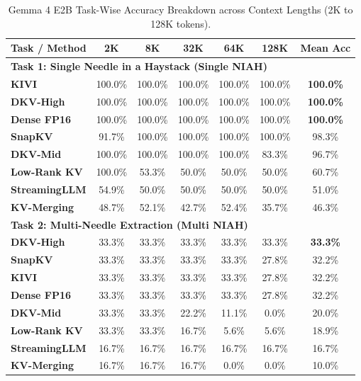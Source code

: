 \documentclass[10pt]{article}
\theoremstyle{definition}
\begin{document}
\begin{table}[h]
\vspace{6pt}
\centering
\small
\caption{Gemma 4 E2B Task-Wise Accuracy Breakdown across Context Lengths (2K to 128K tokens).}
\label{tab:e2b_task_breakdown}
\begin{tabular}{lcccccc}
\toprule
\textbf{Task / Method} & \textbf{2K} & \textbf{8K} & \textbf{32K} & \textbf{64K} & \textbf{128K} & \textbf{Mean Acc} \\
\midrule
\multicolumn{7}{l}{\textbf{Task 1: Single Needle in a Haystack (Single NIAH)}} \\
\textbf{KIVI} & 100.0\% & 100.0\% & 100.0\% & 100.0\% & 100.0\% & \textbf{100.0\%} \\
\textbf{DKV-High} & 100.0\% & 100.0\% & 100.0\% & 100.0\% & 100.0\% & \textbf{100.0\%} \\
\textbf{Dense FP16} & 100.0\% & 100.0\% & 100.0\% & 100.0\% & 100.0\% & \textbf{100.0\%} \\
\textbf{SnapKV} & 91.7\% & 100.0\% & 100.0\% & 100.0\% & 100.0\% & 98.3\% \\
\textbf{DKV-Mid} & 100.0\% & 100.0\% & 100.0\% & 100.0\% & 83.3\% & 96.7\% \\
\textbf{Low-Rank KV} & 100.0\% & 53.3\% & 50.0\% & 50.0\% & 50.0\% & 60.7\% \\
\textbf{StreamingLLM} & 54.9\% & 50.0\% & 50.0\% & 50.0\% & 50.0\% & 51.0\% \\
\textbf{KV-Merging} & 48.7\% & 52.1\% & 42.7\% & 52.4\% & 35.7\% & 46.3\% \\
\midrule
\multicolumn{7}{l}{\textbf{Task 2: Multi-Needle Extraction (Multi NIAH)}} \\
\textbf{DKV-High} & 33.3\% & 33.3\% & 33.3\% & 33.3\% & 33.3\% & \textbf{33.3\%} \\
\textbf{SnapKV} & 33.3\% & 33.3\% & 33.3\% & 33.3\% & 27.8\% & 32.2\% \\
\textbf{KIVI} & 33.3\% & 33.3\% & 33.3\% & 33.3\% & 27.8\% & 32.2\% \\
\textbf{Dense FP16} & 33.3\% & 33.3\% & 33.3\% & 33.3\% & 27.8\% & 32.2\% \\
\textbf{DKV-Mid} & 33.3\% & 33.3\% & 22.2\% & 11.1\% & 0.0\% & 20.0\% \\
\textbf{Low-Rank KV} & 33.3\% & 33.3\% & 16.7\% & 5.6\% & 5.6\% & 18.9\% \\
\textbf{StreamingLLM} & 16.7\% & 16.7\% & 16.7\% & 16.7\% & 16.7\% & 16.7\% \\
\textbf{KV-Merging} & 16.7\% & 16.7\% & 16.7\% & 0.0\% & 0.0\% & 10.0\% \\

\end{tabular}
\end{table}
\end{document}
